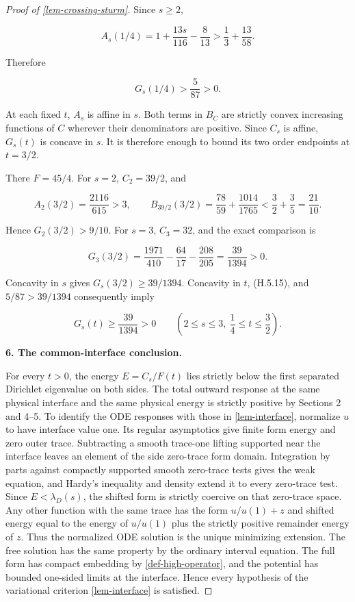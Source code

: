 \documentclass[11pt,a4paper]{article}
\theoremstyle{proofmanuscript}
\begin{document}
\begin{proof}[Proof of \ref{lem-crossing-sturm}]
Since \(s\ge2\),

\[
A_s(1/4)=1+\frac{13s}{116}-\frac8{13}
>\frac13+\frac{13}{58}.
\]

Therefore

\[
G_s(1/4)>\frac5{87}>0.
\tag{H.5.15}
\]

At each fixed \(t\), \(A_s\) is affine in \(s\). Both terms in \(B_C\) are strictly convex increasing functions of \(C\) wherever their denominators are positive. Since \(C_s\) is affine, \(G_s(t)\) is concave in \(s\). It is therefore enough to bound its two order endpoints at \(t=3/2\).

There \(F=45/4\). For \(s=2\), \(C_2=39/2\), and

\[
A_2(3/2)=\frac{2116}{615}>3,
\qquad
B_{39/2}(3/2)=\frac{78}{59}+\frac{1014}{1765}
<\frac32+\frac35=\frac{21}{10}.
\]

Hence \(G_2(3/2)>9/10\). For \(s=3\), \(C_3=32\), and the exact comparison is

\[
G_3(3/2)=\frac{1971}{410}-\frac{64}{17}-\frac{208}{205}
=\frac{39}{1394}>0.
\tag{H.5.16}
\]

Concavity in \(s\) gives \(G_s(3/2)\ge39/1394\). Concavity in \(t\), (H.5.15), and \(5/87>39/1394\) consequently imply

\[
G_s(t)\ge\frac{39}{1394}>0
\qquad\left(2\le s\le3,\ \frac14\le t\le\frac32\right).
\tag{H.5.17}
\]

\textbf{6. The common-interface conclusion.}

For every \(t>0\), the energy \(E=C_s/F(t)\) lies strictly below the first separated Dirichlet eigenvalue on both sides. The total outward response at the same physical interface and the same physical energy is strictly positive by Sections 2 and 4--5. To identify the ODE responses with those in \ref{lem-interface}, normalize \(u\) to have interface value one. Its regular asymptotics give finite form energy and zero outer trace. Subtracting a smooth trace-one lifting supported near the interface leaves an element of the side zero-trace form domain. Integration by parts against compactly supported smooth zero-trace tests gives the weak equation, and Hardy's inequality and density extend it to every zero-trace test. Since \(E<\lambda_D(s)\), the shifted form is strictly coercive on that zero-trace space. Any other function with the same trace has the form \(u/u(1)+z\) and shifted energy equal to the energy of \(u/u(1)\) plus the strictly positive remainder energy of \(z\). Thus the normalized ODE solution is the unique minimizing extension. The free solution has the same property by the ordinary interval equation. The full form has compact embedding by \ref{def-high-operator}, and the potential has bounded one-sided limits at the interface. Hence every hypothesis of the variational criterion \ref{lem-interface} is satisfied.


\end{proof}
\end{document}
